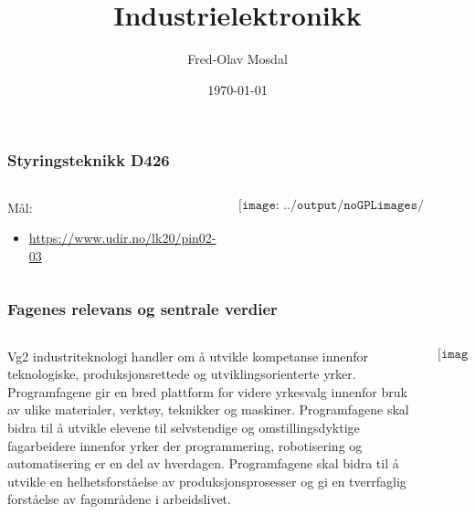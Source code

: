 \documentclass[aspectratio=169,xcolor=dvipsnames]{beamer}
\title[Industrielektronikk]{Industrielektronikk} %
\author[Fred-Olav] {Fred-Olav Mosdal}
\institute[Gand VGS] %
{
    Gand VGS \\
    VG1 TIF }
\date{\today} %
\begin{document}
\begin{frame}
\titlepage
\end{frame}

\begin{frame}
	\frametitle{Styringsteknikk D426}

	\begin{columns}
		\begin{column}{0.5\textwidth}
			Mål:
			\begin{itemize}
				\item \url{https://www.udir.no/lk20/pin02-03}
			\end{itemize}
		\end{column}

		\begin{column}{0.5\textwidth}
			$$\texttt{[image: ../output/noGPLimages/udir.pdf]}$$
		\end{column}
	\end{columns}
\end{frame}

\begin{frame}
	\frametitle{Fagenes relevans og sentrale verdier}

	\begin{columns}
		\begin{column}{0.5\textwidth}
			Vg2 industriteknologi handler om å utvikle kompetanse innenfor teknologiske, produksjonsrettede og utviklingsorienterte yrker. Programfagene gir en bred plattform for videre yrkesvalg innenfor bruk av ulike materialer, verktøy, teknikker og maskiner. Programfagene skal bidra til å utvikle elevene til selvstendige og omstillingsdyktige fagarbeidere innenfor yrker der programmering, robotisering og automatisering er en del av hverdagen. Programfagene skal bidra til å utvikle en helhetsforståelse av produksjonsprosesser og gi en tverrfaglig forståelse av fagområdene i arbeidslivet.
		\end{column}

		\begin{column}{0.5\textwidth}
			$$\texttt{[image: ../output/noGPLimages/udir.pdf]}$$
		\end{column}
	\end{columns}
\end{frame}
\end{document}
